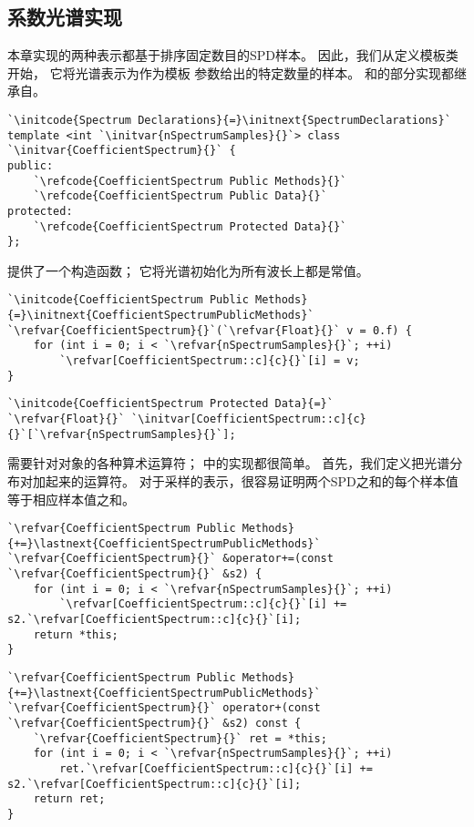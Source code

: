 \subsection{系数光谱实现}\label{sub:系数光谱实现}
本章实现的两种表示都基于排序固定数目的SPD样本。
因此，我们从定义模板类开始，
它将光谱表示为作为模板
参数给出的特定数量的样本。
和的部分实现都继承自。
\begin{lstlisting}
`\initcode{Spectrum Declarations}{=}\initnext{SpectrumDeclarations}`
template <int `\initvar{nSpectrumSamples}{}`> class `\initvar{CoefficientSpectrum}{}` {
public:
    `\refcode{CoefficientSpectrum Public Methods}{}`
    `\refcode{CoefficientSpectrum Public Data}{}`
protected:
    `\refcode{CoefficientSpectrum Protected Data}{}`
};
\end{lstlisting}
提供了一个构造函数；
它将光谱初始化为所有波长上都是常值。
\begin{lstlisting}
`\initcode{CoefficientSpectrum Public Methods}{=}\initnext{CoefficientSpectrumPublicMethods}`
`\refvar{CoefficientSpectrum}{}`(`\refvar{Float}{}` v = 0.f) {
    for (int i = 0; i < `\refvar{nSpectrumSamples}{}`; ++i)
        `\refvar[CoefficientSpectrum::c]{c}{}`[i] = v;
}
\end{lstlisting}
\begin{lstlisting}
`\initcode{CoefficientSpectrum Protected Data}{=}`
`\refvar{Float}{}` `\initvar[CoefficientSpectrum::c]{c}{}`[`\refvar{nSpectrumSamples}{}`];
\end{lstlisting}
需要针对对象的各种算术运算符；
中的实现都很简单。
首先，我们定义把光谱分布对加起来的运算符。
对于采样的表示，很容易证明两个SPD之和的每个样本值等于相应样本值之和。
\begin{lstlisting}
`\refvar{CoefficientSpectrum Public Methods}{+=}\lastnext{CoefficientSpectrumPublicMethods}`
`\refvar{CoefficientSpectrum}{}` &operator+=(const `\refvar{CoefficientSpectrum}{}` &s2) {
    for (int i = 0; i < `\refvar{nSpectrumSamples}{}`; ++i)
        `\refvar[CoefficientSpectrum::c]{c}{}`[i] += s2.`\refvar[CoefficientSpectrum::c]{c}{}`[i];
    return *this;
}
\end{lstlisting}
\begin{lstlisting}
`\refvar{CoefficientSpectrum Public Methods}{+=}\lastnext{CoefficientSpectrumPublicMethods}`
`\refvar{CoefficientSpectrum}{}` operator+(const `\refvar{CoefficientSpectrum}{}` &s2) const {
    `\refvar{CoefficientSpectrum}{}` ret = *this;
    for (int i = 0; i < `\refvar{nSpectrumSamples}{}`; ++i)
        ret.`\refvar[CoefficientSpectrum::c]{c}{}`[i] += s2.`\refvar[CoefficientSpectrum::c]{c}{}`[i];
    return ret;
}
\end{lstlisting}

